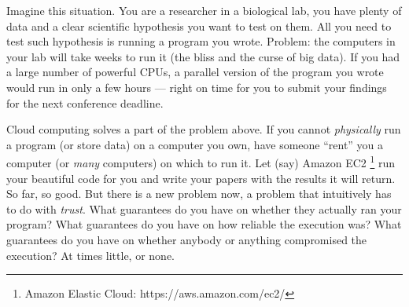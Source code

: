 
Imagine this situation.
You are a researcher in a biological lab, you have plenty of data and a clear scientific hypothesis you want to test on them. All you need to test such hypothesis is running a program you wrote. Problem: the computers in your lab will take weeks to run it (the bliss and the curse of big data). If you had a large number of powerful CPUs, a parallel version of the program you wrote would run in only a few hours --- right on time for you to submit your findings for the next conference deadline.

Cloud computing solves a part of the problem above. If you cannot \textit{physically} run a program (or store data) on a computer you own, have someone ``rent'' you a computer (or \textit{many} computers) on which to run it. Let (say) Amazon EC2 \footnote{Amazon Elastic Cloud: https://aws.amazon.com/ec2/} run your beautiful code for you and write your papers with the results it will return. So far, so good. But there is a new problem now, a problem that intuitively has to do with \textit{trust}. 
What guarantees do you have on whether they actually ran your program? What guarantees do you have on how reliable the execution was? What guarantees do you have on whether anybody or anything compromised the execution? At times little, or none. 


